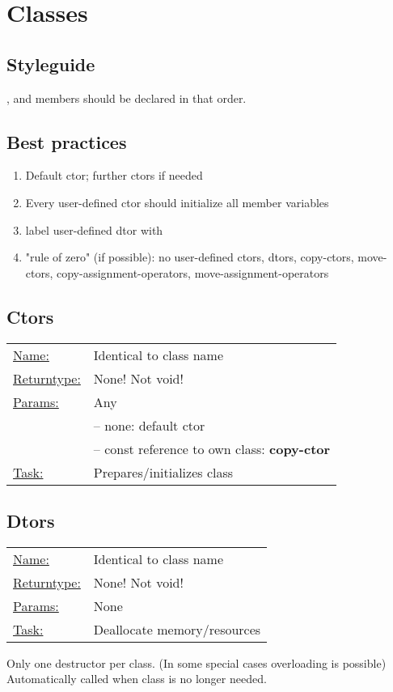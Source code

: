 \section{Classes}
    \vspace{-2mm}
	\vspace{-2mm}

\subsection{Styleguide}
    ,  and  members should be declared in that order.

\subsection{Best practices}
    \begin{enumerate}
        \item Default ctor; further ctors if needed
        \item Every user-defined ctor should initialize all member variables
        \item label user-defined dtor with 
        \item "rule of zero" (if possible): no user-defined ctors, dtors, copy-ctors, move-ctors, copy-assignment-operators, move-assignment-operators
    \end{enumerate}

\subsection{Ctors}
    \begin{tabularx}{\columnwidth}{@{}l X@{}}
        \underline{Name:}          &Identical to class name\\
        \underline{Returntype:}    &None! Not void!\\
        \underline{Params:}        &Any\\
                            &-- none: default ctor\\
                            &-- const reference to own class: \textbf{copy-ctor}\\
        \underline{Task:}          &Prepares/initializes class
    \end{tabularx}

\subsection{Dtors}
    \begin{tabularx}{\columnwidth}{@{}l X@{}}
        \underline{Name:}          &Identical to class name\\
        \underline{Returntype:}    &None! Not void!\\
        \underline{Params:}        &None\\
        \underline{Task:}          &Deallocate memory/resources
    \end{tabularx}
    Only one destructor per class. (In some special cases overloading is possible)\newline
    Automatically called when class is no longer needed.
    
